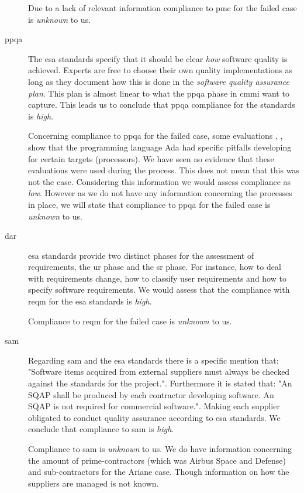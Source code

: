 \begin{description}
Due to a lack of relevant information compliance to \ac{pmc} for the failed case is \textit{unknown} to us. 

\item[\ac{ppqa}]
The \ac{esa} standards specify that it should be clear \textit{how} software quality is achieved. Experts are free to choose their own quality implementations as long as they document how this is done in the \textit{software quality assurance plan}. This plan is almost linear to what the \ac{ppqa} phase in \ac{cmmi} want to capture. This leads us to conclude that \ac{ppqa} compliance for the standards is \textit{high}.

Concerning compliance to \ac{ppqa} for the failed case, some evaluations \citep{monfort1996ariane}, \citep{denskat1996development}, show that the programming language Ada had specific pitfalls developing for certain targets (processors). We have seen no evidence that these evaluations were used during the process. This does not mean that this was not the case. Considering this information we would assess compliance as \textit{low}. However as we do not have any information concerning the  processes in place, we will state that compliance to \ac{ppqa} for the failed case is \textit{unknown} to us.

\item[\ac{dar}]
\ac{esa} standards provide two distinct phases for the assessment of requirements, the \ac{ur} phase and the \ac{sr} phase. For instance, how to deal with requirements change, how to classify user requirements and how to specify software requirements. We would assess that the compliance with \ac{reqm} for the \ac{esa} standards is \textit{high}.

Compliance to \ac{reqm} for the failed case is \textit{unknown} to us. 

\item[\ac{sam}]
Regarding \ac{sam} and the \ac{esa} standards there is a specific mention that\citep[510]{esaSEstandards1991}:  "Software items acquired from external suppliers must always be checked against the standards for the project.". Furthermore it is stated that: "An SQAP shall be produced by each contractor developing software. An SQAP is not required for commercial software.".
Making each supplier obligated to conduct quality assurance according to \ac{esa} standards.
We conclude that compliance to \ac{sam} is \textit{high}.

Compliance to \ac{sam} is \textit{unknown} to us. We do have information concerning the amount of prime-contractors (which was Airbus Space and Defense) and sub-contractors for the Ariane case. Though information on how the suppliers are managed is not known.

\end{description}

